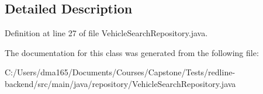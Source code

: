 \subsection{Detailed Description}


Definition at line 27 of file Vehicle\+Search\+Repository.\+java.



The documentation for this class was generated from the following file\+:\begin{DoxyCompactItemize}
\item 
C\+:/\+Users/dma165/\+Documents/\+Courses/\+Capstone/\+Tests/redline-\/backend/src/main/java/repository/Vehicle\+Search\+Repository.\+java\end{DoxyCompactItemize}
